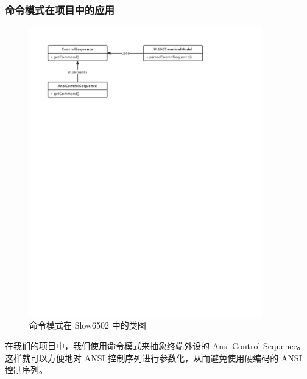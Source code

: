 \subsubsection{命令模式在项目中的应用}

\begin{figure}[H]
    \centering
    \includegraphics[width=0.9\textwidth]{figures/Command.pdf}
    \caption{命令模式在 Slow6502 中的类图}
\end{figure}

在我们的项目中，我们使用命令模式来抽象终端外设的 Ansi Control Sequence。这样就可以方便地对 ANSI 控制序列进行参数化，从而避免使用硬编码的 ANSI 控制序列。

